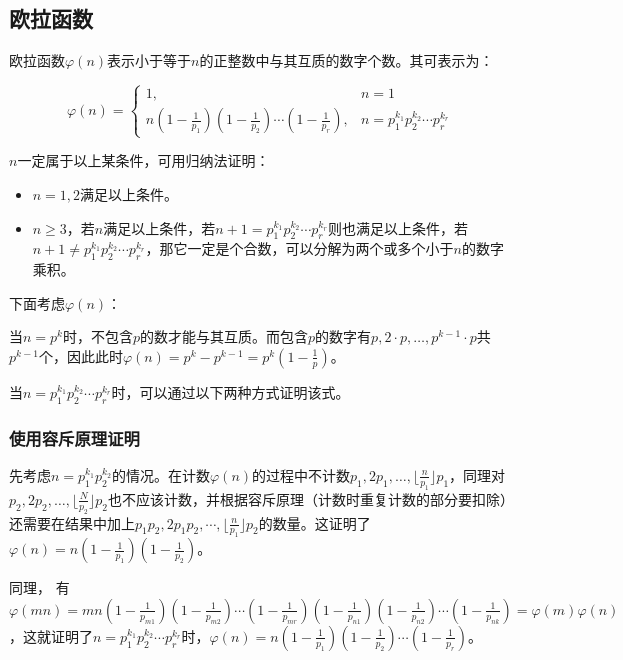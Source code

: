 \documentclass[a4paper]{article}         %
\begin{document}
\subsection{欧拉函数}

欧拉函数$\varphi(n)$表示小于等于$n$的正整数中与其互质的数字个数。其可表示为：

\[
	\varphi(n)=\begin{cases}
		1, &n = 1\\
		n(1- \frac{1}{p_1})(1-\frac{1}{p_2}) \cdots (1-\frac{1}{p_r}), &n = p_{1}^{k_1} p_{2}^{k_2} \cdots p_{r}^{k_r}
	\end{cases}
\]

$n$一定属于以上某条件，可用归纳法证明：

\begin{itemize}
	\item $n=1, 2$满足以上条件。
	\item $n \geq 3$，若$n$满足以上条件，若$n+1 = p_{1}^{k_1}p_{2}^{k_2}\cdots p_{r}^{k_r}$则也满足以上条件，若$n+1 \neq p_{1}^{k_1}p_{2}^{k_2}\cdots p_{r}^{k_r}$，那它一定是个合数，可以分解为两个或多个小于$n$的数字乘积。
\end{itemize}

下面考虑$\varphi(n)$：

当$n = p^k$时，不包含$p$的数才能与其互质。而包含$p$的数字有$p,2\cdot p,\ldots ,p^{k-1}\cdot p$共$p^{k-1}$个，因此此时$\varphi(n) = p^k - p^{k-1} = p^k (1 - \frac{1}{p} )$。

当$n = p_{1}^{k_1}p_{2}^{k_2}\cdots p_{r}^{k_r}$时，可以通过以下两种方式证明该式。

\subsubsection{使用容斥原理证明}

\begin{sloppypar}
先考虑$n = p_{1}^{k_1}p_{2}^{k_2}$的情况。在计数$\varphi(n)$的过程中不计数$p_1, 2p_1, \ldots, \lfloor \frac{n}{p_1} \rfloor p_1$，同理对$p_2, 2p_2, \ldots, \lfloor \frac{N}{p_2} \rfloor p_2$也不应该计数，并根据容斥原理（计数时重复计数的部分要扣除）还需要在结果中加上$p_1p_2, 2p_1p_2, \cdots, \lfloor \frac{n}{p_1} \rfloor p_2$的数量。这证明了$\varphi(n)=n(1-\frac{1}{p_1})(1-\frac{1}{p_2})$。
\end{sloppypar}

同理，%
有$\varphi(mn)=mn(1-\frac{1}{p_{m1}})(1-\frac{1}{p_{m2}}) \cdots (1-\frac{1}{p_{mr}})(1-\frac{1}{p_{n1}})(1-\frac{1}{p_{n2}}) \cdots (1-\frac{1}{p_{nk}}) = \varphi(m)\varphi(n)$，这就证明了$n = p_{1}^{k_1}p_{2}^{k_2} \cdots p_{r}^{k_r}$时，$\varphi(n)=n(1-\frac{1}{p_1})(1-\frac{1}{p_2}) \cdots (1-\frac{1}{p_r})$。
\end{document}
